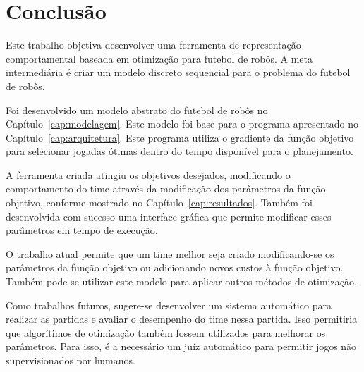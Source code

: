 \chapter{Conclusão}\label{cap:conclusao}


Este trabalho objetiva desenvolver uma ferramenta de representação
comportamental baseada em otimização para futebol de robôs.  A meta
intermediária é criar um modelo discreto sequencial para o problema
do futebol de robôs.

Foi desenvolvido um modelo abstrato do futebol de robôs no
Capítulo~\ref{cap:modelagem}. Este modelo foi base para o programa apresentado
no Capítulo~\ref{cap:arquitetura}. Este programa utiliza o gradiente da função
objetivo para selecionar jogadas ótimas dentro do tempo disponível para o
planejamento.

A ferramenta criada atingiu os objetivos desejados, modificando o comportamento
do time através da modificação dos parâmetros da função objetivo, conforme
mostrado no Capítulo~\ref{cap:resultados}. Também foi desenvolvida com sucesso
uma interface gráfica que permite modificar esses parâmetros em tempo de
execução.

O trabalho atual permite que um time melhor seja criado modificando-se os
parâmetros da função objetivo ou adicionando novos custos à função objetivo.
Também pode-se utilizar este modelo para aplicar outros métodos de otimização.

Como trabalhos futuros, sugere-se desenvolver um sistema automático para
realizar as partidas e avaliar o desempenho do time nessa partida. Isso
permitiria que algorítimos de otimização também fossem utilizados para
melhorar os parâmetros.  Para isso, é a necessário um juíz automático
para permitir jogos não supervisionados por humanos.

